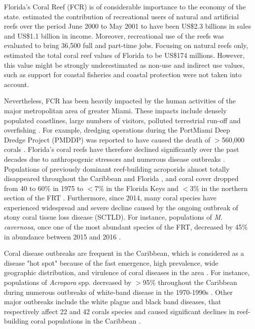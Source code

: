 Florida's Coral Reef (FCR) is of considerable importance to the economy of the state. \cite{johns2003socio} estimated the contribution of recreational users of natural and artificial reefs over the period June 2000 to May 2001 to have been US\$2.3 billions in sales and US\$1.1 billion in income. Moreover, recreational use of the reefs was evaluated to bring 36,500 full and part-time jobs. Focusing on natural reefs only, \cite{brander2013total} estimated the total coral reef values of Florida to be US\$174 millions. However, this value might be strongly underestimated as non-use and indirect use values, such as support for coastal fisheries \citep{ault2006building} and coastal protection \citep{ferrario2014effectiveness} were not taken into account.

Nevertheless, FCR has been heavily impacted by the human activities of the major metropolitan area of greater Miami. These impacts include densely populated coastlines, large numbers of visitors, polluted terrestrial run-off and overfishing \citep{jackson2014status}. For example, dredging operations during the PortMiami Deep Dredge Project (PMDDP) was reported to have caused the death of $>$560,000 corals \citep{cunning2019extensive}. Florida's coral reefs have therefore declined significantly over the past decades due to anthropogenic stressors and numerous disease outbreaks \citep{gardner2003long, jackson2014status,walton2018impacts}. Populations of previously dominant reef-building acroporids almost totally disappeared throughout the Caribbean and Florida \citep{aronson2001white}, and coral cover dropped from 40 to 60\% in 1975 to $<$7\% in the Florida Keys \citep{jackson2014status} and $<$3\% in the northern section of the FRT \citep{walton2018impacts}. Furthermore, since 2014, many coral species have experienced widespread and severe decline caused by the ongoing outbreak of stony coral tissue loss disease (SCTLD). For instance, populations of \textit{M. cavernosa}, once one of the most abundant species of the FRT, decreased by 45\% in abundance between 2015 and 2016 \citep{walton2018impacts}.

Coral disease outbreaks are frequent in the Caribbean, which is considered as a disease "hot spot" because of the fast emergence, high prevalence, wide geographic distribution, and virulence of coral diseases in the area \citep{green2000significance, harvell2007coral}. For instance, populations of  \textit{Acropora} spp. decreased by $>$95\% throughout the Caribbean during numerous outbreaks of white-band disease in the 1970-1990s \citep{aronson2001white}. Other major outbreaks include the white plague and black band diseases, that respectively affect 22 and 42 corals species and caused significant declines in reef-building coral populations in the Caribbean \citep{bruckner2003field,miller2009coral, muller2011black}. 

